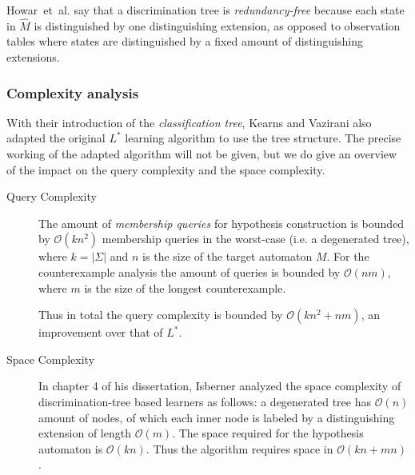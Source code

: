 \documentclass[multi,crop=false,class=article]{standalone}
\begin{document}
Howar~et~al. say that a discrimination tree is \textit{redundancy-free} because
each state in $\hat M$ is distinguished by one distinguishing extension, as
opposed to observation tables where states are distinguished by a fixed amount
of distinguishing extensions\cite{Howar14}.

\subsubsection{Complexity analysis}
\label{sec:complexity-analysis}
With their introduction of the \textit{classification tree}, Kearns and Vazirani
also adapted the original $L^*$ learning algorithm to use the tree
structure\cite{Kearns94}. The precise working of the adapted algorithm will not
be given, but we do give an overview of the impact on the query complexity and
the space complexity.

\begin{description}
\item[Query Complexity] The amount of \textit{membership queries} for hypothesis
  construction is bounded by $\mathcal{O}(kn^2)$ membership queries in the
  worst-case (i.e. a degenerated tree)\cite{Howar14,Kearns94,Isberner14b}, where
  $k = |\Sigma |$ and $n$ is the size of the target automaton $M$. For the
  counterexample analysis the amount of queries is bounded by $\mathcal{O}(nm)$,
  where $m$ is the size of the longest counterexample\cite{Kearns94}.

  Thus in total the query complexity is bounded by $\mathcal{O}(kn^2 + nm)$, an
  improvement over that of $L^*$.
\item[Space Complexity] In chapter 4 of his dissertation, Isberner analyzed the
  space complexity of discrimination-tree based learners as follows: a
  degenerated tree has $\mathcal{O}(n)$ amount of nodes, of which each inner
  node is labeled by a distinguishing extension of length
  $\mathcal{O}(m)$\cite{Isberner15}.  The space required for the hypothesis
  automaton is $\mathcal{O}(kn)$\cite{Isberner15}. Thus the algorithm requires
  space in $\mathcal{O}(kn + mn)$\cite{Isberner14b,Isberner15}.
\end{description}
\end{document}
